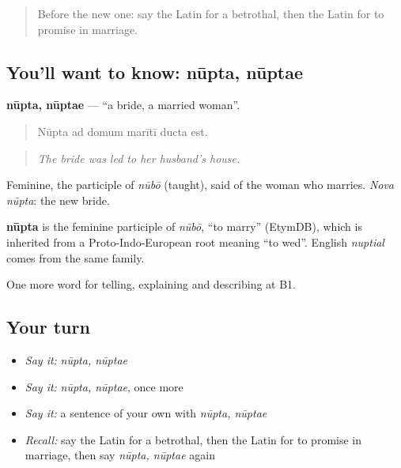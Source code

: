 \label{lesson:LA-C327-nupta}



\begin{quote}
Before the new one: say the Latin for a betrothal, then the Latin for to promise in marriage.
\end{quote}

\subsection*{You'll want to know: nūpta, nūptae}
\textbf{nūpta, nūptae} — \textquotedblleft{}a bride, a married woman\textquotedblright{}.

\begin{quote}
Nūpta ad domum marītī ducta est.
\end{quote}

\begin{quote}
\emph{The bride was led to her husband's house.}
\end{quote}

Feminine, the participle of \emph{nūbō} (taught), said of the woman who marries. \emph{Nova nūpta}: the new bride.

\begin{cousinweb}
\textbf{nūpta} is the feminine participle of \emph{nūbō}, \textquotedblleft{}to marry\textquotedblright{} (EtymDB), which is inherited from a Proto-Indo-European root meaning \textquotedblleft{}to wed\textquotedblright{}. English \emph{nuptial} comes from the same family.
\end{cousinweb}

\begin{grammarlens}[title={What you've built}]
One more word for telling, explaining and describing at B1.
\end{grammarlens}

\subsection*{Your turn}
\begin{itemize}
\raggedright
  \item \emph{Say it:} \emph{nūpta, nūptae}
  \item \emph{Say it:} \emph{nūpta, nūptae}, once more
  \item \emph{Say it:} a sentence of your own with \emph{nūpta, nūptae}
  \item \emph{Recall:} say the Latin for a betrothal, then the Latin for to promise in marriage, then say \emph{nūpta, nūptae} again
\end{itemize}

